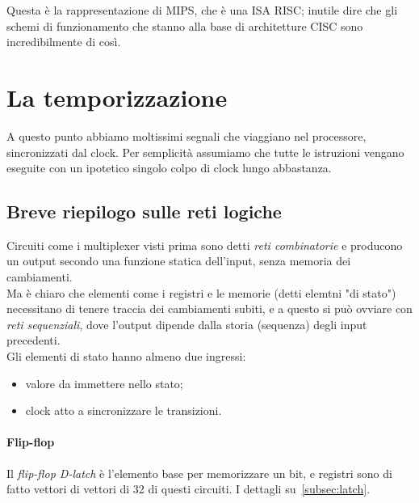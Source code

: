 \documentclass[class=book, crop=false, oneside]{standalone}
\begin{document}
Questa è la rappresentazione di MIPS, che è una ISA RISC; inutile dire che gli schemi di funzionamento che stanno alla base di architetture CISC sono incredibilmente di così.

\section{La temporizzazione}
A questo punto abbiamo moltissimi segnali che viaggiano nel processore, sincronizzati dal clock. Per semplicità assumiamo che tutte le istruzioni vengano eseguite con un ipotetico singolo colpo di clock lungo abbastanza.

\subsection{Breve riepilogo sulle reti logiche}
Circuiti come i multiplexer visti prima sono detti \emph{reti combinatorie} e producono un output secondo una funzione statica dell'input, senza memoria dei cambiamenti.\\
Ma è chiaro che elementi come i registri e le memorie (detti elemtni "di stato") necessitano di tenere traccia dei cambiamenti subiti, e a questo si può ovviare con \emph{reti sequenziali}, dove l'output dipende dalla storia (sequenza) degli input precedenti.\\
Gli elementi di stato hanno almeno due ingressi:
\begin{itemize}
	\item valore da immettere nello stato;
	\item clock atto a sincronizzare le transizioni.
\end{itemize}

\paragraph{Flip-flop}Il \emph{flip-flop D-latch} è l’elemento base per memorizzare un bit, e registri sono di fatto vettori di vettori di 32 di questi circuiti. I dettagli su~\ref{subsec:latch}.
\end{document}
